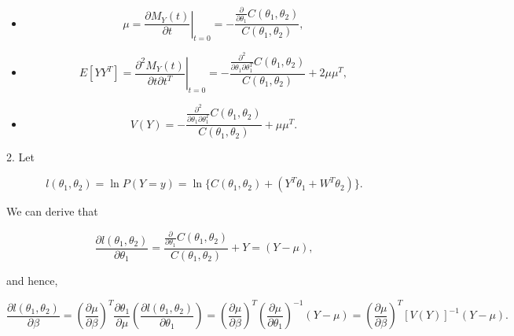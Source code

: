 \documentclass[UTF8,a4paper,10pt]{article}
\begin{document}
\begin{Problem}[]{}
\begin{itemize}
  \item \[\mu=\left.\frac{\partial M_Y(t)}{\partial t}\right|_{t=0}=-\dfrac{\frac{\partial}{\partial \theta_1} C\left(\theta_1, \theta_2\right)}{C\left(\theta_1, \theta_2\right)},\]
  \item \[E\left[Y Y^T\right]=\left.\dfrac{\partial^2 M_Y(t)}{\partial t \partial t^T}\right|_{t=0}=-\frac{\frac{\partial^2}{\partial \theta_1 \partial \theta_1^T} C\left(\theta_1, \theta_2\right)}{C\left(\theta_1, \theta_2\right)}+2 \mu \mu^T,\]
  \item \[V(Y)=-\dfrac{\frac{\partial^2}{\partial \theta_1 \partial \theta_1^T} C\left(\theta_1, \theta_2\right)}{C\left(\theta_1, \theta_2\right)}+\mu \mu^T.\]
\end{itemize}

2. Let 

\[l(\theta_1,\theta_2) = \ln P(Y=y) = \ln \{C(\theta_1,\theta_2)+(Y^T\theta_1 +W^T \theta_2)\}.\]

We can derive that

\[\dfrac{\partial l\left(\theta_1, \theta_2\right)}{\partial \theta_1}=\dfrac{\frac{\partial}{\partial \theta_1} C\left(\theta_1, \theta_2\right)}{C\left(\theta_1, \theta_2\right)}+Y=(Y-\mu),\]

 and hence,
 
$$
\frac{\partial l\left(\theta_1, \theta_2\right)}{\partial \beta}=\left(\frac{\partial \mu}{\partial \beta}\right)^T \frac{\partial \theta_1}{\partial \mu}\left(\frac{\partial l\left(\theta_1, \theta_2\right)}{\partial \theta_1}\right)=\left(\frac{\partial \mu}{\partial \beta}\right)^T\left(\frac{\partial \mu}{\partial \theta_1}\right)^{-1}(Y-\mu)=\left(\frac{\partial \mu}{\partial \beta}\right)^T[V(Y)]^{-1}(Y-\mu) .
$$
\end{Problem}

\end{document}

